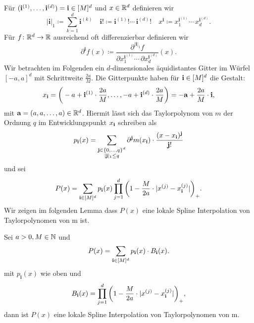 Für $(\mathbf{i}^{(1)},\dots,\mathbf{i}^{(d)}) = \mathbf{i} \in [M]^d$ und $x \in \mathbb{R}^d$ definieren wir
$$|\mathbf{i}|_1 \coloneqq \sum_{k= 1}^d \mathbf{i}^{(k)} \quad \mathbf{i}! \coloneqq \mathbf{i}^{(1)}! \cdots \, \mathbf{i}^{(d)}! \quad x^{\mathbf{i}} \coloneqq x_1^{\mathbf{i}^{(1)}} \cdots \,    x_d^{\mathbf{i}^{(d)}}.$$
Für $f\colon \mathbb{R}^d \to \mathbb{R}$ ausreichend oft differenzierbar definieren wir 
$$\partial^{\mathbf{i}}f(x) \coloneqq \frac{\partial^{|\mathbf{i}|_1}f}{\partial x_1^{\mathbf{i}^{(1)}} \cdots \, \partial x_d^{\mathbf{i}^{(d)}}} (x).$$
Wir betrachten im Folgenden ein $d$-dimensionales äquidistantes Gitter im Würfel $[-a, a]^d$ mit Schrittweite $\frac{2a}{M}.$ Die Gitterpunkte haben für $\mathbf{i} \in [M]^d$ die Gestalt:
$$x_{\mathbf{i}} = \bigg( -a + \mathbf{i}^{(1)} \cdot \frac{2a}{M},\dots, -a + \mathbf{i}^{(d)} \cdot \frac{2a}{M}\bigg) = -\mathbf{a} + \frac{2a}{M} \cdot \mathbf{i},$$
mit $\mathbf{a} = (a, a, \dots, a) \in \mathbb{R}^d$.
Hiermit lässt sich das Taylorpolynom von $m$ der Ordnung $q$ im Entwicklungspunkt $x_{\mathbf{i}}$ schreiben als
$$p_{\mathbf{i}}(x) = \sum_{\substack{\mathbf{j} \in \{0,\dots,q\}^d \\|\mathbf{j}|_1 \leq q}} \partial^{\mathbf{j}}m(x_{\mathbf{i}}) \cdot \frac{(x - x_{\mathbf{i}})^{\mathbf{j}}}{\mathbf{j}!}$$
und sei
\begin{equation}
\label{konvexkomb}
P(x) = \sum_{\mathbf{i} \in [M]^d} p_{\mathbf{i}}(x) \prod_{j = 1}^{d} \bigg(1 - \frac{M}{2a} \cdot |x^{(j)} - x_{\mathbf{i}}^{(j)}|\bigg)_+.
\end{equation}
Wir zeigen im folgenden Lemma dass $P(x)$ eine lokale Spline Interpolation von Taylorpolynomen von m ist.
\begin{lem}
\label{lem:loccon}
Sei $a >0, M \in \mathbb{N}$ und $$P(x) = \sum_{\mathbf{i} \in [M]^d} p_{\mathbf{i}}(x) \cdot B_{\mathbf{i}}(x).$$ mit $p_{\mathbf{i}}(x)$ wie oben und 
$$B_{\mathbf{i}}(x) = \prod_{j = 1}^{d} \bigg(1 - \frac{M}{2a} \cdot |x^{(j)} - x_{\mathbf{i}}^{(j)}|\bigg)_+,$$
dann ist $P(x)$ eine lokale Spline Interpolation von Taylorpolynomen von m.
\end{lem}
